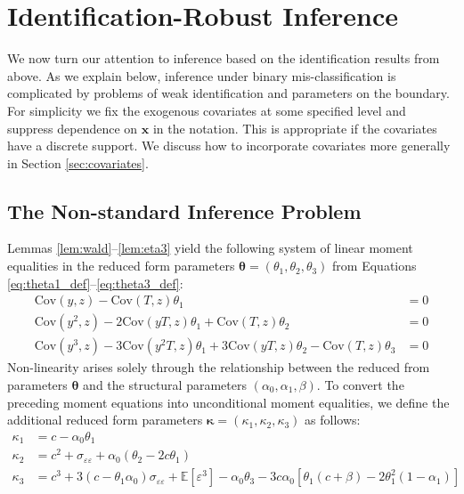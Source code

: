 \section{Identification-Robust Inference}
\label{sec:inference}
We now turn our attention to inference based on the identification results from above.
As we explain below, inference under binary mis-classification is complicated by problems of weak identification and parameters on the boundary.
For simplicity we fix the exogenous covariates at some specified level and suppress dependence on $\mathbf{x}$ in the notation.
This is appropriate if the covariates have a discrete support.
We discuss how to incorporate covariates more generally in Section \ref{sec:covariates}.

\subsection{The Non-standard Inference Problem}
\label{sec:problem}
Lemmas \ref{lem:wald}--\ref{lem:eta3} yield the following system of linear moment equalities in the reduced form parameters $\boldsymbol{\theta} = (\theta_1, \theta_2, \theta_3)$ from Equations \ref{eq:theta1_def}--\ref{eq:theta3_def}:
\begin{align*}
  \mbox{Cov}(y,z) - \mbox{Cov}(T,z) \theta_1 &= 0\\
  \mbox{Cov}(y^2,z) - 2\mbox{Cov}(yT,z) \theta_1 + \mbox{Cov}(T,z)\theta_2 &= 0\\
  \mbox{Cov}(y^3,z) - 3 \mbox{Cov}(y^2T,z) \theta_1 + 3\mbox{Cov}(yT,z) \theta_2 - \mbox{Cov}(T,z) \theta_3 &= 0
\end{align*}
Non-linearity arises solely through the relationship between the reduced from parameters $\boldsymbol{\theta}$ and the structural parameters $(\alpha_0, \alpha_1, \beta)$.
To convert the preceding moment equations into unconditional moment equalities, we define the additional reduced form parameters $\boldsymbol{\kappa} = (\kappa_1, \kappa_2, \kappa_3)$ as follows:
\begin{align*}
\kappa_1 &= c - \alpha_0 \theta_1\\
  \kappa_2 &= c^2 + \sigma_{\varepsilon\varepsilon} + \alpha_0 (\theta_2 - 2c \theta_1)\\
  \kappa_3 &= c^3 + 3\left( c - \theta_1 \alpha_0 \right) \sigma_{\varepsilon\varepsilon} + \mathbb{E}[\varepsilon^3] - \alpha_0 \theta_3 - 3 c \alpha_0 \left[ \theta_1 \left( c + \beta \right) - 2\theta_1^2 (1 - \alpha_1) \right]
\end{align*}
